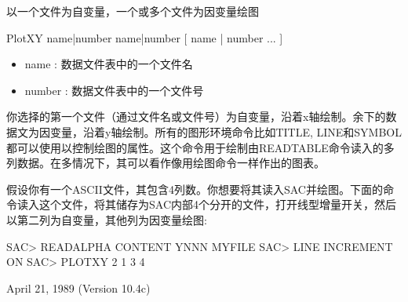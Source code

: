 \label{cmd:plotxy}

以一个文件为自变量，一个或多个文件为因变量绘图

PlotXY name|number  name|number  [ name | number ... ]

\begin{itemize}
\item name : 数据文件表中的一个文件名 
\item number : 数据文件表中的一个文件号 
\end{itemize}

你选择的第一个文件（通过文件名或文件号）为自变量，沿着x轴绘制。余下的数据文为因变量，沿着y轴绘制。所有的图形环境命令比如TITLE, LINE和SYMBOL都可以使用以控制绘图的属性。这个命令用于绘制由READTABLE命令读入的多列数据。在多情况下，其可以看作像用绘图命令一样作出的图表。

假设你有一个ASCII文件，其包含4列数。你想要将其读入SAC并绘图。下面的命令读入这个文件，将其储存为SAC内部4个分开的文件，打开线型增量开关，然后以第二列为自变量，其他列为因变量绘图:
\begin{SACCode}
SAC> READALPHA CONTENT YNNN MYFILE
SAC> LINE INCREMENT ON
SAC> PLOTXY 2 1 3 4
\end{SACCode}

April 21, 1989 (Version 10.4c)
